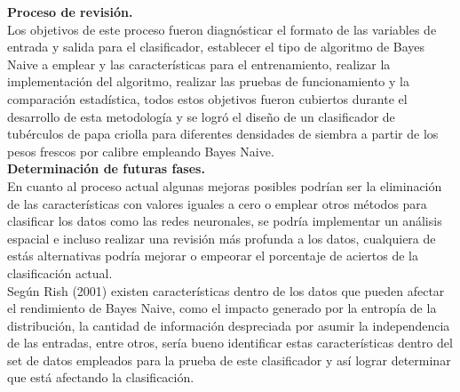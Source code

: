 \noindent
\textbf{Proceso de revisión.}\\

Los objetivos de este proceso fueron diagnósticar el formato de las
variables de entrada y salida para el clasificador, establecer el tipo de
algoritmo de Bayes Naive a emplear y las características para el entrenamiento,
realizar la implementación del algoritmo, realizar las pruebas de funcionamiento
y la comparación estadística, todos estos objetivos fueron cubiertos durante el
desarrollo de esta metodología y se logró el diseño de un clasificador de tubérculos
de papa criolla para diferentes densidades de siembra a partir de los pesos frescos
por calibre empleando Bayes Naive.\\

\noindent
\textbf{Determinación de futuras fases.}\\

En cuanto al proceso actual algunas mejoras posibles podrían ser la eliminación
de las características con valores iguales a cero o emplear otros métodos para
clasificar los datos como las redes neuronales, se podría implementar un análisis espacial e incluso realizar una revisión más profunda a los datos, cualquiera de estás alternativas podría mejorar o empeorar el porcentaje de aciertos de la clasificación actual.\\

Según Rish (2001) existen características dentro de los datos que pueden afectar el
rendimiento de Bayes Naive, como el impacto generado por la entropía de la distribución, la
cantidad de información despreciada por asumir la independencia de las entradas, entre otros,
sería bueno identificar estas características dentro del set de datos empleados para la prueba de
este clasificador y así lograr determinar que está afectando la clasificación.